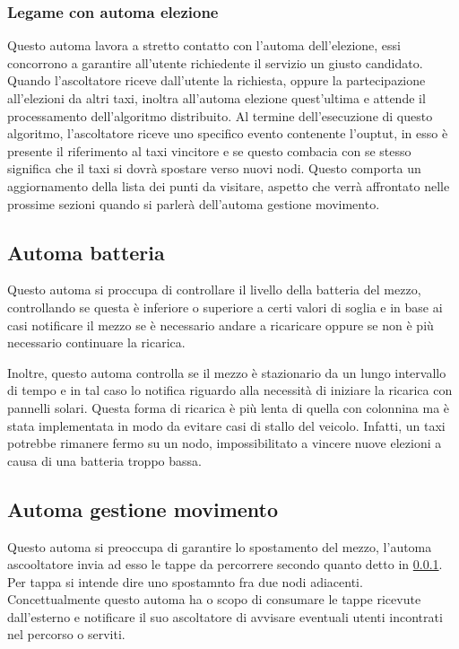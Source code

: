\subsubsection{Legame con automa elezione} \label{listenerElection}
Questo automa lavora a stretto contatto con l'automa dell'elezione, essi concorrono a garantire all'utente richiedente il servizio un giusto candidato. Quando l'ascoltatore riceve dall'utente la richiesta, oppure la partecipazione all'elezioni da altri taxi, inoltra all'automa elezione quest'ultima e attende il processamento dell'algoritmo distribuito. Al termine dell'esecuzione di questo algoritmo, l'ascoltatore riceve uno specifico evento contenente l'ouptut, in esso è presente il riferimento al taxi vincitore e se questo combacia con se stesso significa che il taxi si dovrà spostare verso nuovi nodi. Questo comporta un aggiornamento della lista dei punti da visitare, aspetto che verrà affrontato nelle prossime sezioni quando si parlerà dell'automa gestione movimento.

\subsection{Automa batteria} \label{automaBatteria}
Questo automa si proccupa di controllare il livello della batteria del mezzo, controllando se questa è inferiore o superiore a certi valori di soglia e in base ai casi notificare il mezzo se è necessario andare a ricaricare oppure se non è più necessario continuare la ricarica.

Inoltre, questo automa controlla se il mezzo è stazionario da un lungo intervallo di tempo e in tal caso lo notifica riguardo alla necessità di iniziare la ricarica con pannelli solari. Questa forma di ricarica è più lenta di quella con colonnina ma è stata implementata in modo da evitare casi di stallo del veicolo. Infatti, un taxi potrebbe rimanere fermo su un nodo, impossibilitato a vincere nuove elezioni a causa di una batteria troppo bassa. 

\subsection{Automa gestione movimento} \label{automaMoving}

Questo automa si preoccupa di garantire lo spostamento del mezzo, l'automa ascooltatore invia ad esso le tappe da percorrere secondo quanto detto in \ref{listenerElection}.
Per tappa si intende dire uno spostamnto fra due nodi adiacenti. Concettualmente questo automa ha o scopo di consumare le tappe ricevute dall'esterno e notificare il suo ascoltatore di avvisare eventuali utenti incontrati nel percorso o serviti. 

